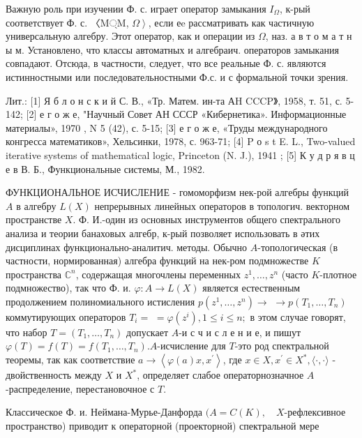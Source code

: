 \documentclass[10pt]{article}
\begin{document}
Важную роль при изучении Ф. с. играет оператор замыкания $I_{\Omega}$, к-рый соответствует Ф. с. 〈M্M, $\left.\Omega\right\rangle$, если еe рассматривать как частичную универсальную алгебру. Этот оператор, как и операции из $\Omega$, наз. а в т о м а т н ы м. Установлено, что классы автоматных и алгебраич. операторов замыкания совпадают. Отсюда, в частности, следует, что все реальные Ф. с. являются истинностными или последовательностными Ф.с. и с формальной точки зрения.



Лит.: [1] Я б л о н с к и й С. В., «Тр. Матем. ин-та АH CCCP》, 1958, т. 51, с. 5-142; [2] е г о ж е, "Научный Совет АН СССР «Кибернетика». Информационные материалы», 1970 , N 5 (42), с. 5-15; [3] е г о ж е, «Труды международного конгресса математиков», Хельсинки, 1978, с. 963-71; [4] P о s t E. L., Two-valued iterative systems of mathematical logic, Princeton (N. J.), 1941 ; [5] К у д р я в ц е в В. Б., Функциональные системы, М., 1982.



ФУНКЦИОНАЛЬНОЕ ИСЧИСЛЕНИЕ - гомоморфизм нек-рой алгебры функций $A$ в алгебру $L(X)$ непрерывных линейных операторов в топологич. векторном пространстве $X$. Ф. И.-один из основных инструментов общего спектрального анализа и теории банаховых алгебр, к-рый позволяет использовать в әтих дисциплинах функционально-аналитич. методы. Обычно $A$-топологическая (в частности, нормированная) алгебра функций на нек-ром подмножестве $K$ пространства $\mathbb{C}^{n}$, содержащая многочлены переменных $z^{1}, \ldots, z^{n}$ (часто $K$-плотное подмножество), так что Ф. и. $\varphi: A \longrightarrow L(X)$ является естественным продолжением полиномиального истисления $p\left(z^{1}, \ldots, z^{n}\right) \longrightarrow$ $\longrightarrow p\left(T_{1}, \ldots, T_{n}\right)$ коммутирующих операторов $T_{i}=$ $=\varphi\left(z^{i}\right), 1 \leqslant i \leqslant n ;$ в этом случае говорят, что набор $T=\left(T_{1}, \ldots, T_{n}\right)$ допускает $A$-и с ч и с л е н и е, и пишут $\varphi(T)=f(T)=f\left(T_{1}, \ldots, T_{n}\right) . A$-исчисление для $T$-это род спектральной теоремы, так как соответствие $a \longrightarrow\left\langle\varphi(a) x, x^{\prime}\right\rangle$, где $x \in X, x^{\prime} \in X^{*},\langle\cdot, \cdot\rangle$ - двойственность между $X$ и $X^{*}$, определяет слабое операторнозначное $A$-распределение, перестановочное с $T$.



Классическое Ф. и. Неймана-Мурье-Данфорда $(A=C(K), \quad X$-рефлексивное пространство) приводит к операторной (проекторной) спектральной мере
\end{document}

